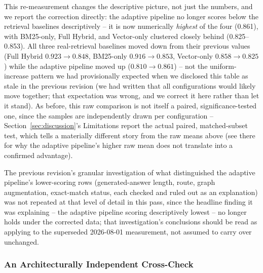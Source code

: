 \documentclass[a4paper,twoside]{article}
\begin{document}
This re-measurement changes the descriptive picture, not just the numbers, and we report the correction directly: the adaptive pipeline no longer scores below the retrieval baselines descriptively -- it is now numerically \emph{highest} of the four (0.861), with BM25-only, Full Hybrid, and Vector-only clustered closely behind (0.825--0.853). All three real-retrieval baselines moved down from their previous values (Full Hybrid $0.923\to0.848$, BM25-only $0.916\to0.853$, Vector-only $0.858\to0.825$) while the adaptive pipeline moved up ($0.810\to0.861$) -- not the uniform-increase pattern we had provisionally expected when we disclosed this table as stale in the previous revision (we had written that all configurations would likely move together; that expectation was wrong, and we correct it here rather than let it stand). As before, this raw comparison is not itself a paired, significance-tested one, since the samples are independently drawn per configuration -- Section~\ref{sec:discussion}'s Limitations report the actual paired, matched-subset test, which tells a materially different story from the raw means above (see there for why the adaptive pipeline's higher raw mean does not translate into a confirmed advantage).

The previous revision's granular investigation of what distinguished the adaptive pipeline's lower-scoring rows (generated-answer length, route, graph augmentation, exact-match status, each checked and ruled out as an explanation) was not repeated at that level of detail in this pass, since the headline finding it was explaining -- the adaptive pipeline scoring descriptively lowest -- no longer holds under the corrected data; that investigation's conclusions should be read as applying to the superseded 2026-08-01 measurement, not assumed to carry over unchanged.

\subsubsection{An Architecturally Independent Cross-Check}
\label{subsec:nli-faithfulness}
\end{document}
